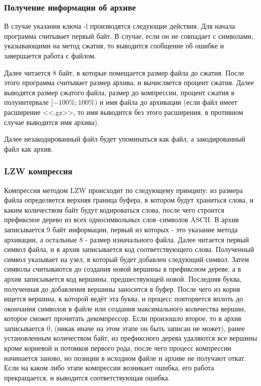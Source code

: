 \documentclass[12pt]{article}
\begin{document}
\subsubsection*{Получение информации об архиве}

В случае указания ключа -l производятся следующие действия. Для начала программа считывает первый байт. В случае, если он не совпадает с символами, указывающими на метод сжатия, то выводится сообщение об ошибке и завершается работа с файлом. 

Далее читается 8 байт, в которые помещается размер файла до сжатия. После этого программа считывает размер архива, и вычисляется процент сжатия. Далее выводятся размер сжатого файла, размер до компрессии, процент сжатия в полуинтервале $[-100\%; 100\%)$ и имя файла до архивации (если файл имеет расширение <<.gz>>, то имя выводится без этого расширения, в противном случае выводится имя архива).

Далее незакодированный файл будет упоминаться как файл, а закодированный файл как архив.

\subsubsection*{LZW компрессия}

Компрессия методом LZW происходит по следующему принципу: из размера файла определяется верхняя граница буфера, в котором будут храниться слова, и каким количеством байт будут кодироваться слова, после чего строится префиксное дерево из всех односимвольных слов--символов ASCII. В архив записывается 9 байт информации, первый из которых - это указание метода архивации, а остальные 8 - размер изначального файла. Далее читается первый символ файла, и в архив записывается код соответствующего слова. Полученный символ указывает на узел, в который будет добавлен следующий символ. Затем символы считываются до создания новой вершины в префиксном дереве, а в архив записывается код вершины, предшествующей новой. Последняя буква, полученная до добавления вершины заносится в буфер. После чего из корня ищется вершина, к которой ведёт эта буква, и процесс повторяется вплоть до окончания символов в файле или создания максимального количества вершин, которое сможет прочитать декомпрессор. Если произошло второе, то в архив записывается $0$, (никак иначе на этом этапе он быть записан не может), ранее установленным количеством байт, из префиксного дерева удаляются все вершины кроме корневой и потомков первого рода, после чего процесс компрессии начинается заново, но позиции в исходном файле и архиве не получают откат. Если на каком либо этапе компрессии возникает ошибка, его работа прекращается, и выводится соответствующая ошибка.
\end{document}
